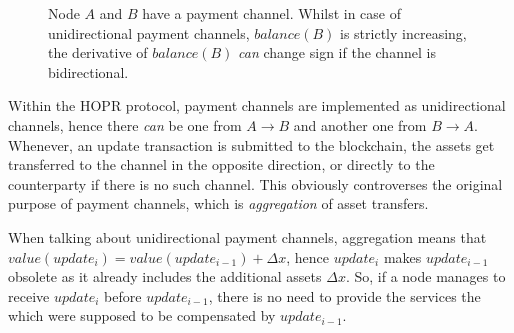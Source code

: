 \begin{figure}[H]
    \centering
    \label{fig:channels}
    \caption{Node $A$ and $B$ have a payment channel. Whilst in case of unidirectional payment channels, $balance(B)$ is strictly increasing, the derivative of $balance(B)$ \textit{can} change sign if the channel is bidirectional.}
\end{figure}

Within the HOPR protocol, payment channels are implemented as unidirectional channels, hence there \textit{can} be one from $A \rightarrow B$ and another one from $B \rightarrow A$. Whenever, an update transaction is submitted to the blockchain, the assets get transferred to the channel in the opposite direction, or directly to the counterparty if there is no such channel. This obviously controverses the original purpose of payment channels, which is \textit{aggregation} of asset transfers.

When talking about unidirectional payment channels, aggregation means that $value(update_i) = value(update_{i-1}) + \Delta x$, hence $update_i$ makes $update_{i-1}$ obsolete as it already includes the additional assets $\Delta x$. So, if a node manages to receive $update_i$ before $update_{i-1}$, there is no need to provide the services the which were supposed to be compensated by $update_{i-1}$.


